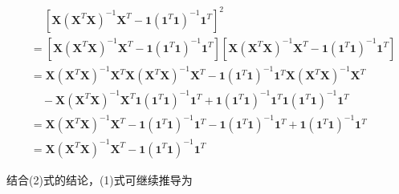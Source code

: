 \documentclass[UTF8]{ctexart}
\begin{document}
    \begin{equation}
    	\begin{aligned}
    		& \quad \  [\boldsymbol{X} (\boldsymbol{X}^T \boldsymbol{X})^{-1} \boldsymbol{X}^T - \boldsymbol{1}  (\boldsymbol{1}^T \boldsymbol{1})^{-1} \boldsymbol{1}^T]^2 \\
    		& = [\boldsymbol{X} (\boldsymbol{X}^T \boldsymbol{X})^{-1} \boldsymbol{X}^T - \boldsymbol{1}  (\boldsymbol{1}^T \boldsymbol{1})^{-1} \boldsymbol{1}^T] [\boldsymbol{X} (\boldsymbol{X}^T \boldsymbol{X})^{-1} \boldsymbol{X}^T - \boldsymbol{1}  (\boldsymbol{1}^T \boldsymbol{1})^{-1} \boldsymbol{1}^T] \\
    		& = \boldsymbol{X} (\boldsymbol{X}^T \boldsymbol{X})^{-1} \boldsymbol{X}^T \boldsymbol{X} (\boldsymbol{X}^T \boldsymbol{X})^{-1} \boldsymbol{X}^T - \boldsymbol{1} (\boldsymbol{1}^T \boldsymbol{1})^{-1} \boldsymbol{1}^T \boldsymbol{X} (\boldsymbol{X}^T \boldsymbol{X})^{-1} \boldsymbol{X}^T \\
    		& \quad - \boldsymbol{X} (\boldsymbol{X}^T \boldsymbol{X})^{-1} \boldsymbol{X}^T \boldsymbol{1} (\boldsymbol{1}^T \boldsymbol{1})^{-1} \boldsymbol{1}^T + \boldsymbol{1} (\boldsymbol{1}^T \boldsymbol{1})^{-1} \boldsymbol{1}^T \boldsymbol{1} (\boldsymbol{1}^T \boldsymbol{1})^{-1} \boldsymbol{1}^T \\
    		& = \boldsymbol{X} (\boldsymbol{X}^T \boldsymbol{X})^{-1} \boldsymbol{X}^T - \boldsymbol{1} (\boldsymbol{1}^T \boldsymbol{1})^{-1} \boldsymbol{1}^T - \boldsymbol{1} (\boldsymbol{1}^T \boldsymbol{1})^{-1} \boldsymbol{1}^T + \boldsymbol{1} (\boldsymbol{1}^T \boldsymbol{1})^{-1} \boldsymbol{1}^T \\
    		& = \boldsymbol{X} (\boldsymbol{X}^T \boldsymbol{X})^{-1} \boldsymbol{X}^T - \boldsymbol{1} (\boldsymbol{1}^T \boldsymbol{1})^{-1} \boldsymbol{1}^T
    	\end{aligned}
    \end{equation}
    
    结合(2)式的结论，(1)式可继续推导为
    
\end{document}

